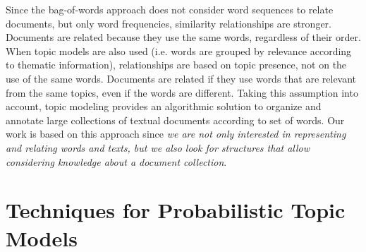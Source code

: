 Since the bag-of-words approach does not consider word sequences to relate documents, but only word frequencies, similarity relationships are stronger. Documents are related because they use the same words, regardless of their order. When topic models are also used (i.e. words are grouped by relevance according to thematic information), relationships are based on topic presence, not on the use of the same words. Documents are related if they use words that are relevant from the same topics, even if the words are different. Taking this assumption into account, topic modeling provides an algorithmic solution to organize and annotate large collections of textual documents according to set of words. Our work is based on this approach since \textit{we are not only interested in representing and relating words and texts, but we also look for structures that allow considering knowledge about a document collection}.



\section{Techniques for Probabilistic Topic Models}\label{sec:techniques-prob-topics}

